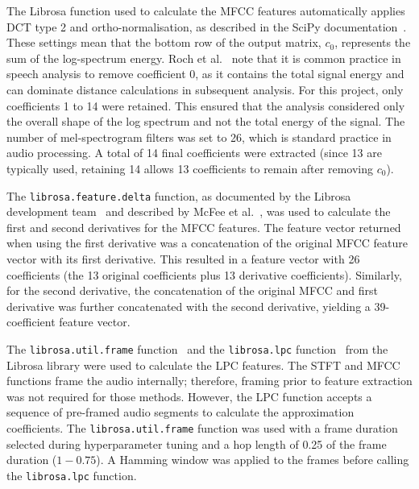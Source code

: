 The Librosa function used to calculate the \acs{MFCC} features automatically applies \ac{DCT} type 2 and ortho-normalisation, as described in the 
SciPy documentation~\cite{mfcc_dct_type}. These settings mean that the 
bottom row of the output matrix, $c_0$, represents the sum of the log-spectrum energy. Roch et al.~\cite{mfcc_c_zero} note that it is common practice 
in speech analysis to remove coefficient 0, as it contains the total signal energy and can dominate distance calculations in subsequent analysis. For this project, only coefficients 1 to 14 were 
retained. This ensured that the analysis considered only the overall shape of the log spectrum and not the total energy of the signal. The number of 
mel-spectrogram filters was set to 26, which is standard practice in audio processing. A total of 14 final coefficients were extracted (since 13 are typically 
used, retaining 14 allows 13 coefficients to remain after removing $c_0$).

The \texttt{librosa.feature.delta} function, as documented by the Librosa development team~\cite{lib_delta} and described by McFee et al.~\cite{librosa}, 
was used to calculate the first and second derivatives for the \acs{MFCC} features. The 
feature vector returned when using the first derivative was a concatenation of the original \acs{MFCC} feature vector with its first derivative. This resulted 
in a feature vector with 26 coefficients (the 13 original coefficients plus 13 derivative coefficients). Similarly, for the second derivative, the concatenation 
of the original \acs{MFCC} and first derivative was further concatenated with the second derivative, yielding a 39-coefficient feature vector.


\label{sec:lpc}
The \texttt{librosa.util.frame} function~\cite{lib_util_frame} and the \texttt{librosa.lpc} function~\cite{lib_lpc} from the Librosa library 
were used to calculate the \ac{LPC} features. The \acs{STFT} 
and \acs{MFCC} functions frame the audio internally; therefore, framing prior to feature extraction was not required for those methods. However, the \acs{LPC} 
function accepts a sequence of pre-framed audio segments to calculate the approximation coefficients. The \texttt{librosa.util.frame} function was used with 
a frame duration selected during hyperparameter tuning and a hop length of 0.25 of the frame duration ($1 - 0.75$). A Hamming window was applied to the frames 
before calling the \texttt{librosa.lpc} function.

